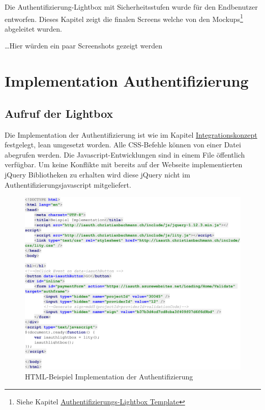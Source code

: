 Die Authentifizierung-Lightbox mit Sicherheitsstufen wurde für den
Endbenutzer entworfen. Dieses Kapitel zeigt die finalen Screens welche
von den Mockups\footnote{Siehe Kapitel
  \protect\hyperlink{authentifizierungs-lightbox-template}{Authentifizierungs-Lightbox
  Template}} abgeleitet wurden.

\ldots{}Hier würden ein paar Screenshots gezeigt werden

\newpage

\section{Implementation
Authentifizierung}\label{implementation-authentifizierung}

\subsection{Aufruf der Lightbox}\label{aufruf-der-lightbox}

Die Implementation der Authentifizierung ist wie im Kapitel
\protect\hyperlink{integrationskonzept}{Integrationskonzept} festgelegt,
lean umgesetzt worden. Alle CSS-Befehle können von einer Datei abegrufen
werden. Die Javascript-Entwicklungen sind in einem File öffentlich
verfügbar. Um keine Konflikte mit bereits auf der Webseite
implementierten jQuery Bibliotheken zu erhalten wird diese jQuery nicht
im Authentifizierungsjavascript mitgeliefert.

\begin{figure}[htbp]
\centering
\includegraphics{images/code/implementation_lightbox.png}
\caption{HTML-Beispiel Implementation der Authentifizierung}
\end{figure}

